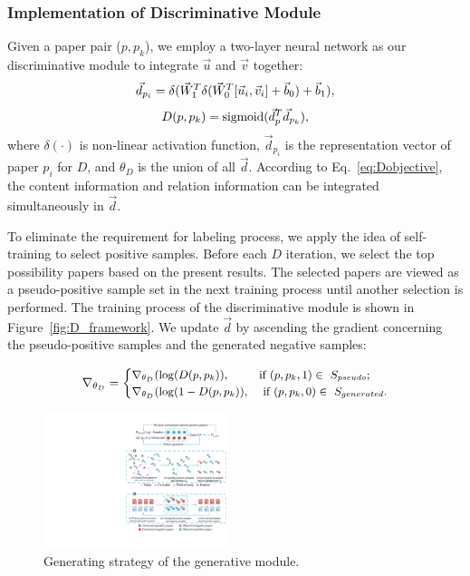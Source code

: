 \documentclass[letterpaper]{article} %
\begin{document}
\subsubsection{Implementation of Discriminative Module}
Given a paper pair ($p, p_k$), 
we employ a two-layer neural network as our discriminative module to integrate $\vec{u}$ and $\vec{v}$ together:
\begin{equation}
\centering
\vec{d}_{p_i}=\delta(\vec{W}_1^T\delta(\vec{W}_0^T[\vec{u}_i,\vec{v}_i]+\vec{b}_0)+\vec{b}_1),
\label{eq:d}
\end{equation}
\vspace{-5pt}
\begin{equation}
\centering
D(p, p_k)=\text{sigmoid}(\vec{d}_{p}^T\vec{d}_{p_k}),
\label{eq:Dobjective}
\end{equation}
where $\delta(\cdot)$ is non-linear activation function, $\vec{d}_{p_i}$ is the representation vector of paper $p_i$ for $D$, and $\theta_D$ is the union of all $\vec{d}$.
According to Eq.~\eqref{eq:Dobjective}, the content information and relation information can be integrated simultaneously in $\vec{d}$.

To eliminate the requirement for labeling process, we apply the idea of self-training \cite{self1,self2} to select positive samples. Before each $D$ iteration, we select the top possibility papers based on the present results. The selected papers are viewed as a pseudo-positive sample set in the next training process until another selection is performed. The training process of the discriminative module is shown in Figure~\ref{fig:D_framework}.
We update $\vec{d}$ by ascending the gradient concerning the pseudo-positive samples and the generated negative samples:

\begin{equation}
\small
\centering
\nabla_{\theta_D} = \begin{cases} \nabla_{\theta_D}(\log(D(p, p_k)), & \mbox{if } (p, p_k, 1) \in \mbox{ $S_{pseudo}$}; \\ 
\nabla_{\theta_D}(\log(1-D(p, p_k)), & \mbox{ if }  (p, p_k, 0) \in\mbox{ $S_{generated}$}.\\ 
\end{cases}
\label{eq:Dgradient}
\end{equation}

\begin{figure}[t]
\centering
\includegraphics[width=0.48\textwidth]{G.pdf}
\caption{Generating strategy of the generative module.}
\label{fig:G_framework}
\end{figure}
\end{document}
